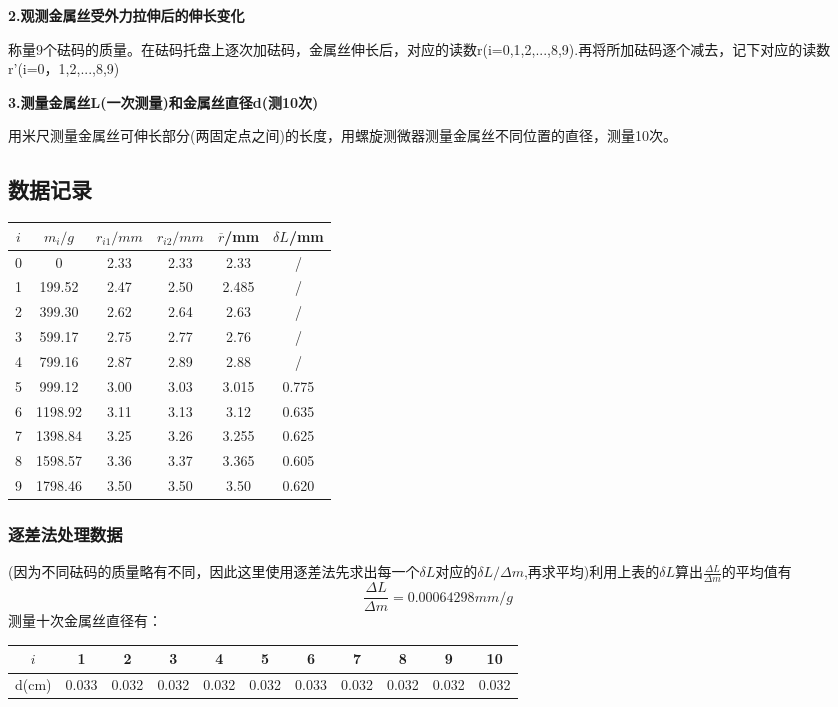 \documentclass[a4paper, 10pt]{article}
\begin{document}
\vspace{10pt}
\noindent \textbf{2.观测金属丝受外力拉伸后的伸长变化}

\noindent 称量9个砝码的质量。在砝码托盘上逐次加砝码，金属丝伸长后，对应的读数r(i=0,1,2,...,8,9).再将所加砝码逐个减去，记下对应的读数r'(i=0，1,2,...,8,9)

\vspace{10pt}
\noindent \textbf{3.测量金属丝L(一次测量)和金属丝直径d(测10次)}

\noindent 用米尺测量金属丝可伸长部分(两固定点之间)的长度，用螺旋测微器测量金属丝不同位置的直径，测量10次。


\subsection{数据记录}

\vspace{10pt}
\begin{center}
    \begin{tabular}{|c|c|c|c|c|c|}
      \hline
      $i $& $m_i/g$ & $r_{i1}/mm$ & $r_{i2}/mm$ & $\overline{r}$/mm&$\delta L$/mm\\
      \hline
      0 &0 &2.33&2.33&2.33&/\\
      \hline
      1 & 199.52&2.47&2.50&2.485&/\\
      \hline
      2 &399.30 &2.62&2.64&2.63&/\\
      \hline
      3 & 599.17&2.75&2.77&2.76&/\\
      \hline
      4 &799.16 &2.87&2.89&2.88&/\\
      \hline
      5 &999.12 &3.00&3.03&3.015&0.775\\
      \hline
      6 &1198.92 &3.11&3.13&3.12&0.635\\
      \hline
      7 & 1398.84&3.25&3.26&3.255&0.625\\
      \hline
      8 &1598.57 &3.36&3.37&3.365&0.605\\
      \hline
      9 & 1798.46&3.50&3.50&3.50&0.620\\
      \hline
    \end{tabular}
  \end{center}
\subsubsection{逐差法处理数据}
\noindent (因为不同砝码的质量略有不同，因此这里使用逐差法先求出每一个$\delta L$对应的$\delta L/\Delta m$,再求平均)利用上表的$\delta L$算出$\frac{\Delta L}{\Delta m}$的平均值有
$$\frac{\Delta L}{\Delta m}=0.00064298mm/g$$
测量十次金属丝直径有：
\begin{center}
    \begin{tabular}{|c|c|c|c|c|c|c|c|c|c|c|}
      \hline
      $i $& 1 & 2 & 3 & 4&5&6&7&8&9&10\\
      \hline
      d(cm)&0.033 &0.032 &0.032&0.032&0.032&0.033&0.032&0.032&0.032&0.032\\
      \hline
      
    \end{tabular}
  \end{center}
\end{document}
